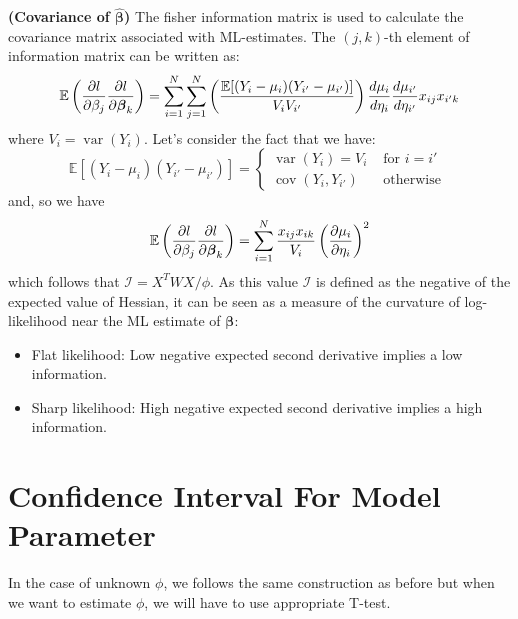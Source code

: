 \begin{remark}{\textbf{(Covariance of $\hat{\boldsymbol \beta}$)}}
    The fisher information matrix is used to calculate the covariance matrix associated with ML-estimates. The $(j, k)$-th element of information matrix can be written as:
    \begin{equation*}
        \mathbb{E}\left( \frac{\partial l}{\partial \beta_j}\frac{\partial l}{\partial \boldsymbol \beta_k} \right) = \sum^N_{i=1}\sum^N_{j=1} \left( \frac{ \mathbb{E}[(Y_i - \mu_i)(Y_{i'} - \mu_{i'})] }{V_iV_{i'}} \right)\frac{d\mu_i}{d\eta_i}\frac{d\mu_{i'}}{d\eta_{i'}}x_{ij}x_{i'k}
    \end{equation*}
    where $V_i = \operatorname{var}(Y_i)$. Let's consider the fact that we have:
    \begin{equation*}
        \mathbb{E}[(Y_i - \mu_i)(Y_{i'} - \mu_{i'})] = \begin{cases}
            \operatorname{var}(Y_i) = V_i & \text{ for } i = i' \\
            \operatorname{cov}(Y_i, Y_{i'}) & \text{ otherwise }
        \end{cases}
    \end{equation*}
    and, so we have 
    \begin{equation*}
        \mathbb{E}\left( \frac{\partial l}{\partial \beta_j}\frac{\partial l}{\partial \boldsymbol \beta_k} \right) = \sum^N_{i=1}\frac{x_{ij}x_{ik}}{V_i}\left( \frac{\partial \mu_i}{\partial \eta_i} \right)^2
    \end{equation*}
    which follows that $\mathcal{I} = X^TWX/\phi$. As this value $\mathcal{I}$ is defined as the negative of the expected value of Hessian, it can be seen as a measure of the curvature of log-likelihood near the ML estimate of $\boldsymbol \beta$:
    \begin{itemize}
        \item Flat likelihood: Low negative expected second derivative implies a low information. 
        \item Sharp likelihood: High negative expected second derivative implies a high information. 
    \end{itemize}
\end{remark}

\section{Confidence Interval For Model Parameter}

\begin{remark}
    In the case of unknown $\phi$, we follows the same construction as before but when we want to estimate $\phi$, we will have to use appropriate T-test.  
\end{remark}

